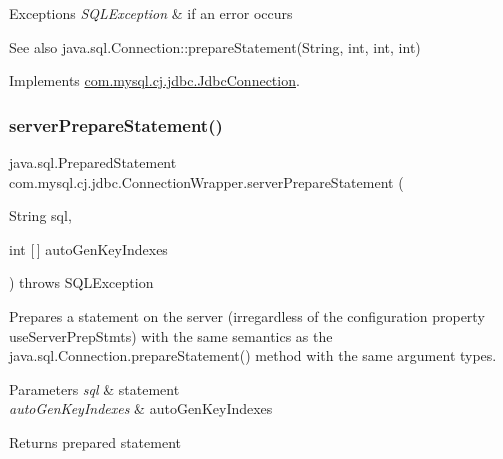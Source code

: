 \begin{DoxyExceptions}{Exceptions}
{\em S\+Q\+L\+Exception} & if an error occurs\\
\hline
\end{DoxyExceptions}
\begin{DoxySeeAlso}{See also}
java.\+sql.\+Connection\+::prepare\+Statement(\+String, int, int, int) 
\end{DoxySeeAlso}


Implements \mbox{\hyperlink{interfacecom_1_1mysql_1_1cj_1_1jdbc_1_1_jdbc_connection_a0c300ea92f3c97874b104b5e999b440b}{com.\+mysql.\+cj.\+jdbc.\+Jdbc\+Connection}}.

\mbox{\label{classcom_1_1mysql_1_1cj_1_1jdbc_1_1_connection_wrapper_a9ae046833df9f5a89755a54dd65d43b0}} 
\subsubsection{\texorpdfstring{server\+Prepare\+Statement()}{serverPrepareStatement()}\hspace{0.1cm}{\footnotesize\ttfamily [5/6]}}
{\footnotesize\ttfamily java.\+sql.\+Prepared\+Statement com.\+mysql.\+cj.\+jdbc.\+Connection\+Wrapper.\+server\+Prepare\+Statement (\begin{DoxyParamCaption}\item[{String}]{sql,  }\item[{int \mbox{[}$\,$\mbox{]}}]{auto\+Gen\+Key\+Indexes }\end{DoxyParamCaption}) throws S\+Q\+L\+Exception}

Prepares a statement on the server (irregardless of the configuration property \textquotesingle{}use\+Server\+Prep\+Stmts\textquotesingle{}) with the same semantics as the java.\+sql.\+Connection.\+prepare\+Statement() method with the same argument types.


\begin{DoxyParams}{Parameters}
{\em sql} & statement \\
\hline
{\em auto\+Gen\+Key\+Indexes} & auto\+Gen\+Key\+Indexes \\
\hline
\end{DoxyParams}
\begin{DoxyReturn}{Returns}
prepared statement 
\end{DoxyReturn}

